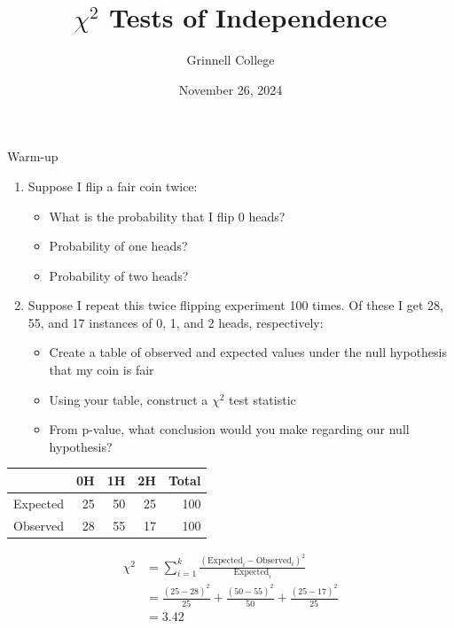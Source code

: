 \documentclass{beamer}
\title[Introduction to Statistics)]{$\chi^2$ Tests of Independence}
\subtitle{}
\author{Grinnell College}
\date{November 26, 2024}
\begin{document}
\begin{frame}
  \titlepage
\end{frame}

\begin{frame}{Warm-up}
\begin{enumerate}
\item Suppose I flip a fair coin twice:
\begin{itemize}
\item What is the probability that I flip 0 heads?
\item Probability of one heads?
\item Probability of two heads?
\end{itemize} \vspace{8mm}
\item Suppose I repeat this twice flipping experiment 100 times. Of these I get 28, 55, and 17 instances of 0, 1, and 2 heads, respectively:
\begin{itemize}
\item Create a table of observed and expected values under the null hypothesis that my coin is fair
\item Using your table, construct a $\chi^2$ test statistic
\item From p-value, what conclusion would you make regarding our null hypothesis?
\end{itemize}
\end{enumerate}
\end{frame}

\begin{frame}
\begin{table}[ht]
\centering
\begin{tabular}{rrrrr}
  \hline
 & 0H & 1H & 2H & Total\\
  \hline
Expected & 25 & 50 & 25 & 100 \\ 
  Observed & 28 & 55 & 17 & 100 \\ 
   \hline
\end{tabular}
\end{table} \vspace{4mm}

\begin{align*}
\chi^2 &= \sum_{i=1}^k \frac{(\text{Expected}_i - \text{Observed}_i)^2}{\text{Expected}_i} \\[1em]
&= \frac{(25-28)^2}{25} + \frac{(50-55)^2}{50} + \frac{(25-17)^2}{25}\\[1em]
&= 3.42
\end{align*}
\end{frame}
\end{document}
